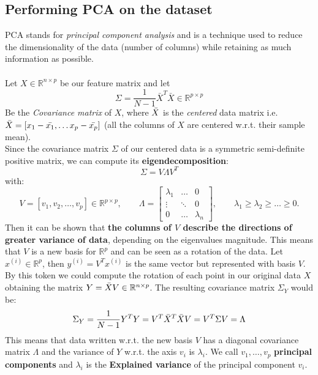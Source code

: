 \subsection{Performing PCA on the dataset}
PCA stands for \textit{principal component analysis} and is a technique used to reduce the dimensionality of the data (number of columns) while retaining as much information as possible.
\\
\\
Let \(X \in \mathbb{R}^{n \times p}\) be our feature matrix and let
\begin{equation}
    \Sigma = \frac{1}{N- 1} \bar{X}^T\bar{X} \in \mathbb{R}^{p \times p}
\end{equation}
Be the \textit{Covariance matrix} of \(X\), where \(\Bar{X}\) is the \textit{centered} data matrix i.e. \(\Bar{X} = [x_1 - \Bar{x_1}, \dots x_p - \Bar{x_p}]\) (all the columns of \(X\) are centered w.r.t. their sample mean). \\
Since the covariance matrix \(\Sigma\) of our centered data is a symmetric semi-definite positive matrix, we can compute its \textbf{eigendecomposition}:
\begin{equation}
    \Sigma = V \Lambda V^T
\end{equation}
with:
\begin{equation}
 V = [v_1, v_2, \dots, v_p] \in \mathbb{R}^{p \times p}, \qquad \Lambda = \begin{bmatrix}
    \lambda_1 & \dots & 0 \\
    \vdots & \ddots & 0 \\
    0 & \dots & \lambda_n
 \end{bmatrix}, \qquad \lambda_1 \geq \lambda_2 \geq \dots \geq 0.
\end{equation}
Then it can be shown that \textbf{the columns of \(V\) describe the directions of greater variance of data}, depending on the eigenvalues magnitude. This means that \(V\) is a new basis for \(\mathbb{R}^p\) and can be seen as a rotation of the data. Let \(x^{(i)}\in \mathbb{R}^p\), then \(y^{(i)} = V^T x^{(i)}\) is the same vector but represented with basis \(V\). By this token we could compute the rotation of each point in our original data \(X\) obtaining the matrix \(Y = \Bar{X}V\in \mathbb{R}^{n\times p}\). The resulting covariance matrix \(\Sigma_Y\) would be:
\begin{equation}
    \Sigma_Y = \frac{1}{N- 1} Y^T Y = V^T \Bar{X}^T \Bar{X} V = V^T \Sigma V = \Lambda
\end{equation}
This means that data written w.r.t. the new basis \(V\) has a diagonal covariance matrix \(\Lambda\) and the variance of \(Y\) w.r.t. the axis \(v_i\) is \(\lambda_i\). We call \(v_1, \dots , v_p\) \textbf{principal components} and \(\lambda_i\) is the \textbf{Explained variance} of the principal component \(v_i\). \\
